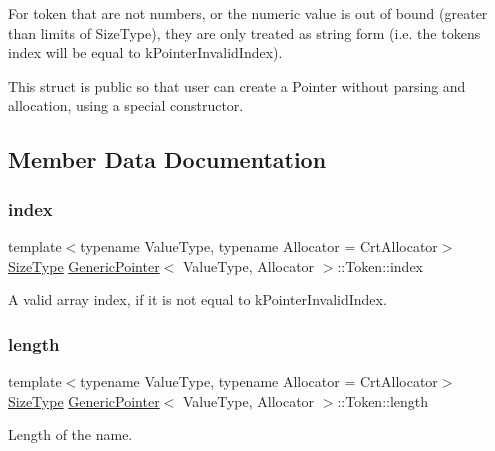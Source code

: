 For token that are not numbers, or the numeric value is out of bound (greater than limits of Size\+Type), they are only treated as string form (i.\+e. the token\textquotesingle{}s index will be equal to k\+Pointer\+Invalid\+Index).

This struct is public so that user can create a Pointer without parsing and allocation, using a special constructor. 

\subsection{Member Data Documentation}
\mbox{\label{structGenericPointer_1_1Token_a0ce571cfe3f3da942a5912bb2cd24dcf}} 
\subsubsection{\texorpdfstring{index}{index}}
{\footnotesize\ttfamily template$<$typename Value\+Type, typename Allocator = Crt\+Allocator$>$ \\
\hyperlink{rapidjson_8h_a5ed6e6e67250fadbd041127e6386dcb5}{Size\+Type} \hyperlink{classGenericPointer}{Generic\+Pointer}$<$ Value\+Type, Allocator $>$\+::Token\+::index}



A valid array index, if it is not equal to k\+Pointer\+Invalid\+Index. 

\mbox{\label{structGenericPointer_1_1Token_a67383574032a3289d34002bb2d95df6d}} 
\subsubsection{\texorpdfstring{length}{length}}
{\footnotesize\ttfamily template$<$typename Value\+Type, typename Allocator = Crt\+Allocator$>$ \\
\hyperlink{rapidjson_8h_a5ed6e6e67250fadbd041127e6386dcb5}{Size\+Type} \hyperlink{classGenericPointer}{Generic\+Pointer}$<$ Value\+Type, Allocator $>$\+::Token\+::length}



Length of the name. 

